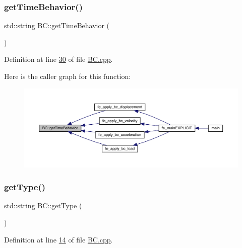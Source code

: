 \subsubsection{\texorpdfstring{get\+Time\+Behavior()}{getTimeBehavior()}}
{\footnotesize\ttfamily std\+::string B\+C\+::get\+Time\+Behavior (\begin{DoxyParamCaption}{ }\end{DoxyParamCaption})}



Definition at line \hyperlink{_b_c_8cpp_source_l00030}{30} of file \hyperlink{_b_c_8cpp_source}{B\+C.\+cpp}.

Here is the caller graph for this function\+:\nopagebreak
\begin{figure}[H]
\begin{center}
\leavevmode
\includegraphics[width=350pt]{class_b_c_a3590d0a29a9261d99f21ee75340e5722_icgraph}
\end{center}
\end{figure}
\mbox{\label{class_b_c_aa6afb3d4586f395578bef89c77e60449}} 
\subsubsection{\texorpdfstring{get\+Type()}{getType()}}
{\footnotesize\ttfamily std\+::string B\+C\+::get\+Type (\begin{DoxyParamCaption}{ }\end{DoxyParamCaption})}



Definition at line \hyperlink{_b_c_8cpp_source_l00014}{14} of file \hyperlink{_b_c_8cpp_source}{B\+C.\+cpp}.

